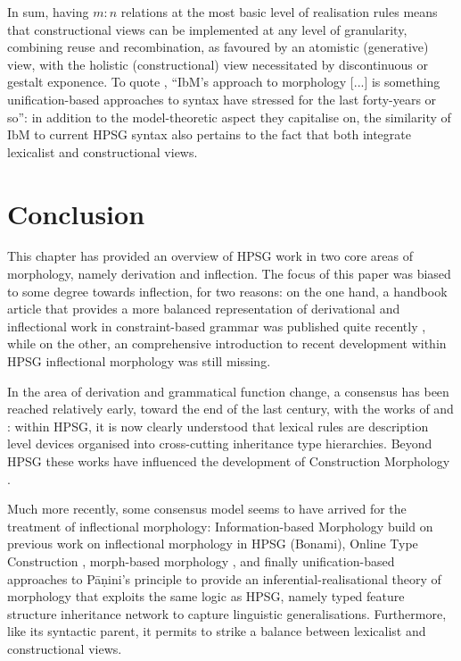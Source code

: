 \bigskip\noindent In sum, having $m:n$ relations at the most basic
level of realisation rules means that constructional views can be
implemented at any level of granularity, combining reuse and
recombination, as favoured by an atomistic (generative) view, with the
holistic (constructional) view necessitated by discontinuous or
gestalt exponence.  To quote \citet{diaz:koenig:michelson:19}, ``IbM’s
approach to morphology [...] is something unification-based approaches
to syntax have stressed for the last forty-years or so'': in addition
to the model-theoretic aspect they capitalise on, the similarity of
IbM to current HPSG syntax also pertains to the fact that both integrate
lexicalist and constructional views.

\section{Conclusion}

This chapter has provided an overview of HPSG work in two core areas
of morphology, namely derivation and inflection. The focus of this
paper was biased to some degree towards inflection, for two reasons:
on the one hand, a handbook article that provides a more balanced
representation of derivational and inflectional work in
constraint-based grammar was published quite recently
\citep{Bonami15b}, while on the other, an comprehensive introduction
to recent development within HPSG inflectional morphology was still
missing.

In the area of derivation and grammatical function change, a consensus
has been reached relatively early, toward the end of the last century,
with the works of \citet{Riehemann98} and \cite{Koenig99}:
within HPSG, it is now clearly understood that lexical rules are
description level devices organised into cross-cutting inheritance
type hierarchies. Beyond HPSG these works have influenced the
development of Construction Morphology \citep{Booij10}. 

Much more recently, some consensus model seems to have arrived for the
treatment of inflectional morphology: Information-based Morphology
\citep{Crysmann:Bonami:2016,Crysmann:14:OUP} build on previous work on
inflectional morphology in HPSG (Bonami), Online Type Construction
\citep{Koenig99}, morph-based morphology \citep{crysmann_b03book}, and
finally unification-based approaches to Pāṇini's principle
\citep{Andrews90,Erjavec94,Koenig99} to provide an
inferential-realisational theory of morphology that exploits the same
logic as HPSG, namely typed feature structure inheritance network to
capture linguistic generalisations. Furthermore, like its syntactic
parent, it permits to strike a balance between lexicalist and
constructional views.




